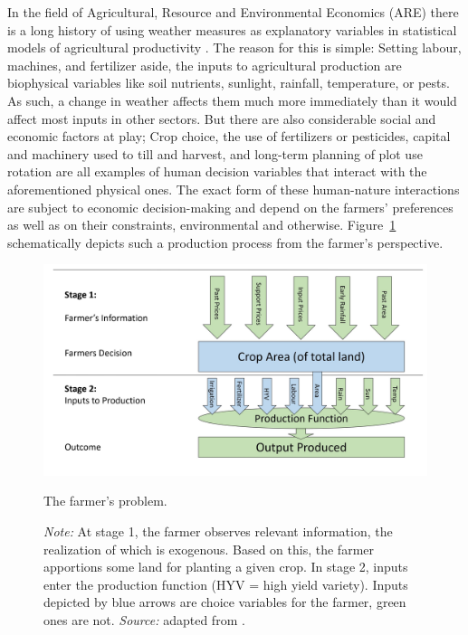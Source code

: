\documentclass[a4paper,12pt]{article}
\theoremstyle{plain}
\theoremstyle{definition}
\theoremstyle{definition}
\theoremstyle{definition}
\theoremstyle{definition}
\begin{document}
In the field of Agricultural, Resource and Environmental Economics (ARE) there is a long history of using weather measures as explanatory variables in statistical models of agricultural productivity \citep[e.g.][]{Fisher1925}. The reason for this is simple: Setting labour, machines, and fertilizer aside, the inputs to agricultural production are biophysical variables like soil nutrients, sunlight, rainfall, temperature, or pests. As such, a change in weather affects them much more immediately than it would affect most inputs in other sectors. But there are also considerable social and economic factors at play; Crop choice, the use of fertilizers or pesticides, capital and machinery used to till and harvest, and long-term planning of plot use rotation are all examples of human decision variables that interact with the aforementioned physical ones. The exact form of these human-nature interactions are subject to economic decision-making and depend on the farmers’ preferences as well as on their constraints, environmental and otherwise.  Figure~\ref{fig:production_auffhammer} schematically depicts such a production process from the farmer's perspective.

\begin{figure}[t!]
    \centering
    \includegraphics[scale=0.5]{fig_production_auffhammer.JPG}
    \caption{The farmer's problem.}
    \caption*{\footnotesize{\textit{Note:} At stage 1, the farmer observes relevant information, the realization of which is exogenous. Based on this, the farmer apportions some land for planting a given crop. In stage 2, inputs enter the production function (HYV = high yield variety). Inputs depicted by blue arrows are choice variables for the farmer, green ones are not. \textit{Source:} adapted from \citet{Auffhammer2014b}.}}
    \label{fig:production_auffhammer}
\end{figure}
\end{document}
